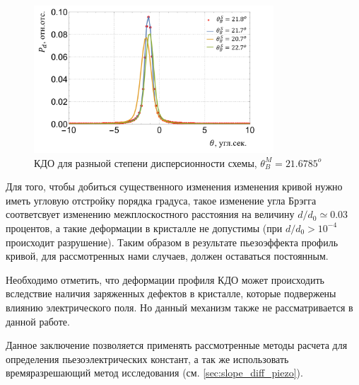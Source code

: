 \begin{figure}[H]
  \centering
  \includegraphics[width=0.8\textwidth]{images/FWHM_diference_bragg_KDO.png}
  \caption{КДО для разныой степени дисперсионности схемы, $\theta_B^M = 21.6785 ^o$}
  \label{ris:FWHM_diference_bragg_KDO}
\end{figure}

Для того, чтобы добиться существенного изменения изменения кривой нужно
иметь угловую отстройку порядка градуса, такое изменение угла Брэгга
соответсвует изменению межплоскостного расстояния на величину $d/d_0 \simeq 0.03$
процентов, а такие деформации в кристалле не допустимы (при $d/d_0 > 10^{-4}$ происходит разрушение).
Таким образом в результате пьезоэффекта профиль кривой, для рассмотренных нами случаев,
должен оставаться постоянным.

Необходимо отметить, что деформации профиля КДО может происходить вследствие наличия
заряженных дефектов в кристалле, которые подвержены влиянию электрического поля. Но данный механизм
также не рассматривается в данной работе.

Данное заключение позволяется применять рассмотренные методы расчета для определения пьезоэлектрических констант,
а так же использовать времяразрешающий метод исследования (см. \ref{sec:slope_diff_piezo}).
